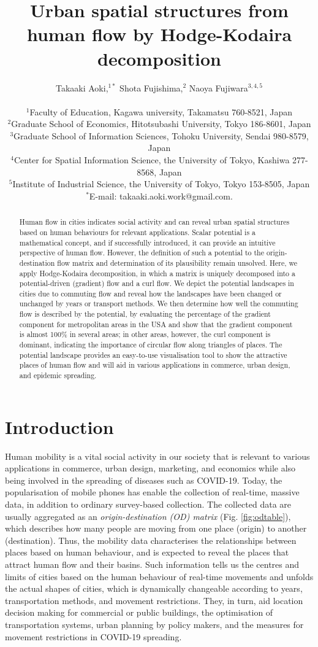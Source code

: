 \documentclass[]{article}
\title{Urban spatial structures from human flow by Hodge-Kodaira decomposition}
\author
{Takaaki Aoki,$^{1\ast}$ Shota Fujishima,$^{2}$ Naoya Fujiwara$^{3,4,5}$\\
\\
\normalsize{$^{1}$Faculty of Education, Kagawa university, Takamatsu 760-8521, Japan}\\
\normalsize{$^{2}$Graduate School of Economics, Hitotsubashi University, Tokyo 186-8601, Japan}\\
\normalsize{$^{3}$Graduate School of Information Sciences, Tohoku University, Sendai 980-8579, Japan}\\
\normalsize{$^{4}$Center for Spatial Information Science, the University of Tokyo, Kashiwa 277-8568, Japan}\\
\normalsize{$^{5}$Institute of Industrial Science, the University of Tokyo, Tokyo 153-8505, Japan}
\\
\normalsize{$^\ast$E-mail:  takaaki.aoki.work@gmail.com.}
}
\date{} %
\begin{document}
%
\maketitle 

\begin{abstract}
Human flow in cities indicates social activity and can reveal urban spatial structures based on human behaviours for relevant applications.
Scalar potential is a mathematical concept, and if successfully introduced, it can provide an intuitive perspective of  human flow.
%
However, the definition of such a potential to the origin-destination flow matrix and determination of its plausibility remain unsolved.
Here, we apply Hodge-Kodaira decomposition, in which a matrix is uniquely decomposed into a potential-driven (gradient) flow and a curl flow.
We depict the potential landscapes in cities due to commuting flow and reveal how the landscapes have been changed or unchanged by years or transport methods.
We then determine how well the commuting flow is described by the potential, by evaluating the percentage of the gradient component for metropolitan areas in the USA and show that the gradient component is almost 100\% in several areas; in other areas, however, the curl component is dominant, indicating the importance of circular flow along triangles of places.
The potential landscape  provides an easy-to-use visualisation tool to show the attractive places of human flow and will aid in various applications in  commerce, urban design, and epidemic spreading.
%
\end{abstract}



\section*{Introduction}
%
Human mobility is a vital social activity in our society that is relevant to various applications in commerce, urban design, marketing, and economics while also being involved in the spreading of diseases such as COVID-19.
Today, the popularisation of mobile phones has enable the collection of real-time, massive data, in addition to ordinary survey-based collection.
The collected data are usually aggregated as an \textit{origin-destination (OD) matrix} (Fig. \ref{fig:odtable}),
which describes how many people are moving from one place (origin) to another (destination).
Thus, the mobility data characterises the relationships between places based on human behaviour,
%
and is expected to reveal the places that attract human flow and their basins.
Such information tells us the centres and limits of cities based on the human behaviour of real-time movements and unfolds the actual shapes of cities,
which is dynamically changeable according to years, transportation methods, and movement restrictions.
They, in turn, aid location decision making for commercial or public buildings, the optimisation of transportation systems, urban planning by policy makers, and the measures for movement restrictions in COVID-19 spreading.
\end{document}
